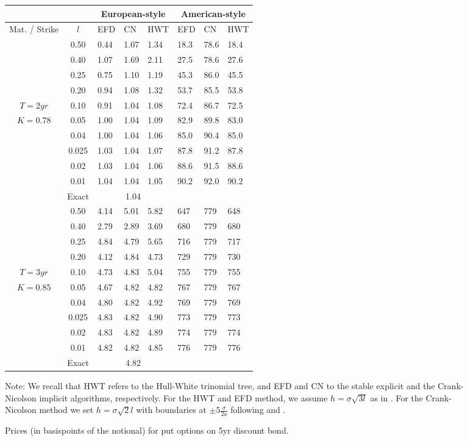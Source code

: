 \begin{figure}[h!]
\caption{Prices (in basispoints of the notional) for put options on 5yr
  discount bond.\label{Puts}} 
\begin{center}
\begin{tabular}{|c|c|lll|lll|}
\hline\hline
\multicolumn{2}{|c|}{} & \multicolumn{3}{|c|}{European-style} &
\multicolumn{3}{|c|}{American-style} \\
\hline
Mat. / Strike & $l$ & EFD & CN & HWT & EFD & CN & HWT  \\
\hline 
& 0.50 & 0.44 & 1.07& 1.34& 18.3& 78.6 & 18.4 \\
& 0.40 & 1.07 & 1.69& 2.11& 27.5& 78.6 & 27.6 \\
& 0.25 & 0.75 & 1.10& 1.19& 45.3& 86.0 & 45.5 \\
& 0.20 & 0.94 & 1.08& 1.32& 53.7& 85.5 & 53.8 \\
$T=2yr$ & 0.10 & 0.91 & 1.04& 1.08& 72.4& 86.7 & 72.5 \\
$K=0.78$& 0.05 & 1.00 & 1.04& 1.09& 82.9& 89.8 & 83.0 \\
& 0.04 & 1.00 & 1.04& 1.06& 85.0& 90.4 & 85.0 \\
& 0.025 & 1.03 & 1.04& 1.07& 87.8& 91.2 & 87.8 \\
& 0.02 & 1.03 & 1.04& 1.06& 88.6& 91.5 & 88.6 \\
& 0.01 & 1.04 & 1.04& 1.05& 90.2& 92.0 & 90.2 \\
\hline 
& Exact & \multicolumn{3}{|c|}{1.04} & \multicolumn{3}{|c|}{} \\
\hline
& 0.50 &  4.14& 5.01& 5.82&647&779  &648 \\
& 0.40 &  2.79& 2.89& 3.69&680&779  &680\\
& 0.25 &  4.84& 4.79& 5.65&716&779  &717 \\
& 0.20 &  4.12& 4.84& 4.73&729&779  &730  \\
$T=3yr$& 0.10 &  4.73& 4.83& 5.04&755&779  &755  \\
$K=0.85$& 0.05 &  4.67& 4.82& 4.82&767&779  &767  \\
& 0.04 &  4.80& 4.82& 4.92&769&779  &769\\
& 0.025&  4.83& 4.82& 4.90&773&779  &773 \\
& 0.02 &  4.83& 4.82& 4.89&774&779  &774 \\
& 0.01 &  4.82& 4.82& 4.85&776&779  &776\\
\hline 
& Exact & \multicolumn{3}{|c|}{4.82} & \multicolumn{3}{|c|}{} \\
\hline
\end{tabular}
\end{center}

Note: We recall that HWT refers to the Hull-White trinomial tree, and
  EFD and CN to the stable explicit and the Crank-Nicolson
  implicit algorithms, respectively. For the HWT and EFD method, we assume
  $h=\sigma \sqrt{3 l}$ as in \cite{HW:1994}. For the Crank-Nicolson
  method we set $h= \sigma \sqrt{2} l$ with boundaries at $\pm 5
  \frac{\sigma}{2 a}$ following \cite{C:2004} and  \cite{D:2010}.  

\end{figure}

